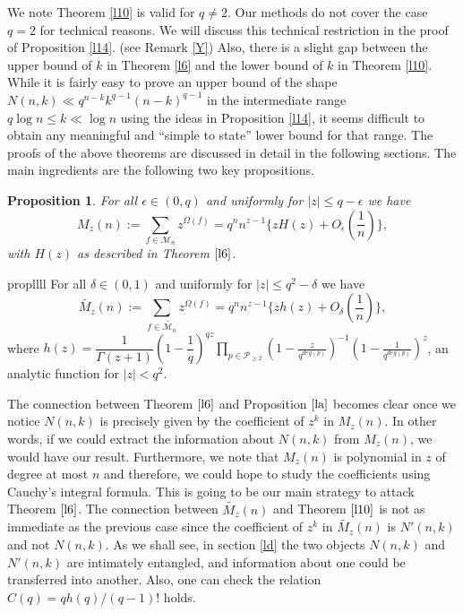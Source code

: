 \documentclass[12pt]{amsart}
\numberwithin{equation}{section}
\newtheorem{prop}[theorem]{Proposition}
\theoremstyle{remark}
\theoremstyle{remark}
\theoremstyle{definition}
\begin{document}
We note Theorem \ref{l10} is valid for $q\neq 2$. Our methods do not cover the case $q=2$ for technical reasons. We will discuss this technical restriction in the proof of Proposition \ref{l14}. (see Remark \ref{Y}) Also, there is a slight gap between the upper bound of $k$ in Theorem \ref{l6} and the lower bound of $k$ in Theorem \ref{l10}. While it is fairly easy to prove an upper bound of the shape $N(n,k)\ll q^{n-k}k^{q-1}(n-k)^{q-1}$ in the intermediate range $q\log n \leqslant k \ll \log n$ using the ideas in Proposition \ref{l14}, it seems difficult to obtain any meaningful and ``simple to state'' lower bound for that range. The proofs of the above theorems are discussed in detail in the following sections. The main ingredients are the following two key propositions.
\begin{prop}\label{la}
For all $\epsilon\in(0,q)$ and uniformly for $|z|\leqslant q-\epsilon$ we have
$${M_z}(n):=\displaystyle\sum\limits_{f\in {\mathcal{M}_n}}z^{\Omega(f)}=q^nn^{z-1}\Bigg \{zH(z)+O_{\epsilon}\left(\dfrac{1}{n} \right) \Bigg \},$$
with $H(z)$ as described in Theorem $\ref{l6}$.
\end{prop}
\begin{restatable}{prop}{llll}\label{lb}
For all $\delta\in(0,1)$ and uniformly for $|z|\leqslant q^2-\delta$ we have
$$\widetilde{M_z}(n):=\displaystyle\sum\limits_{f\in\widetilde{\mathcal{M}_n}}z^{\Omega(f)}=q^nn^{z-1}\Bigg \{zh(z)+O_{\delta}\left(\dfrac{1}{n} \right) \Bigg \},$$
where $h(z)=\dfrac{1}{\Gamma(z+1)}\left( 1-\dfrac{1}{q}\right)^{qz}\displaystyle\prod\limits_{p\in\mathcal{P}_{\geqslant 2}}\left(1-\frac{z}{q^{deg(p)}}\right)^{-1}\left( 1-\frac{1}{q^{deg(p)}}\right)^z$, an analytic function for $|z|<q^2$.
\end{restatable}
The connection between Theorem $\ref{l6}$ and Proposition $\ref{la}$ becomes clear once we notice $N(n,k)$ is precisely given by the coefficient of $z^k$ in $M_z(n)$. In other words, if we could extract the information about $N(n,k)$ from $M_z(n)$, we would have our result. Furthermore, we note that $M_z(n)$ is polynomial in $z$ of degree at most $n$ and therefore, we could hope to study the coefficients using Cauchy's integral formula. This is going to be our main strategy to attack Theorem $\ref{l6}$. The connection between $\widetilde{M_z}(n)$ and Theorem $\ref{l10}$ is not as immediate as the previous case since the coefficient of $z^k$ in $\widetilde{M_z}(n)$ is $N'(n,k)$ and not $N(n,k)$. As we shall see, in section \ref{ld} the two objects $N(n,k)$ and $N'(n,k)$ are intimately entangled, and information about one could be transferred into another. Also, one can check the relation $C(q)=qh(q)/(q-1)!$ holds.\\
\end{document}
